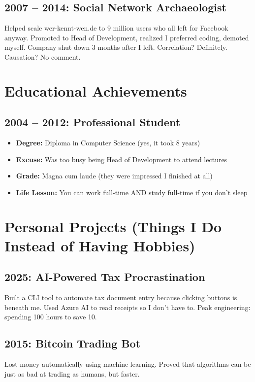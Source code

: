 \documentclass[11pt,a4paper]{article}
\begin{document}
\subsection*{2007 -- 2014: Social Network Archaeologist}
Helped scale wer-kennt-wen.de to 9 million users who all left for Facebook anyway. Promoted to Head of Development, realized I preferred coding, demoted myself. Company shut down 3 months after I left. Correlation? Definitely. Causation? No comment.

\section*{Educational Achievements}

\subsection*{2004 -- 2012: Professional Student}
\begin{itemize}
\item \textbf{Degree:} Diploma in Computer Science (yes, it took 8 years)
\item \textbf{Excuse:} Was too busy being Head of Development to attend lectures
\item \textbf{Grade:} Magna cum laude (they were impressed I finished at all)
\item \textbf{Life Lesson:} You can work full-time AND study full-time if you don't sleep
\end{itemize}

\section*{Personal Projects (Things I Do Instead of Having Hobbies)}

\subsection*{2025: AI-Powered Tax Procrastination}
Built a CLI tool to automate tax document entry because clicking buttons is beneath me. Used Azure AI to read receipts so I don't have to. Peak engineering: spending 100 hours to save 10.

\subsection*{2015: Bitcoin Trading Bot}
Lost money automatically using machine learning. Proved that algorithms can be just as bad at trading as humans, but faster.
\end{document}
